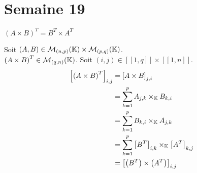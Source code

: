 \documentclass{article}
\renewenvironment{question_kholle}[2][ ]
{
	\subsection{\texorpdfstring{#2}{}}
	\notblank{#1}
	{
		\noindent #1
		\bigbreak
	}
	{}
	\begin{proof}
}
{
	\end{proof}
}
\begin{document}
\pagebreak\section{Semaine 19}

	{$\left(A \times B\right)^T = B^T \times A^T$}

	Soit $(A, B) \in \mathcal{M}_{(n,p)}(\mathbb K) \times \mathcal{M}_{(p,q)}(\mathbb K)$. \\
	$\left(A \times B\right)^T \in \mathcal{M}_{(q,n)}(\mathbb K)$. Soit $(i, j) \in [\![1,q]\!] \!\times\! [\![1,n]\!]$.
	\begin{equation*}
		\begin{aligned}
			\left[ \left(A \times B\right)^T \right]_{i,j}
			 & = \left[A \times B\right]_{j,i}                                          \\
			 & = \sum_{k=1}^{p} A_{j,k} \times_{\mathbb K} B_{k,i}                               \\
			 & = \sum_{k=1}^{p} B_{k,i} \times_{\mathbb K} A_{j,k}                               \\
			 & = \sum_{k=1}^{p} \left[B^T\right]_{i,k} \times_{\mathbb K} \left[A^T\right]_{k,j} \\
			 & = \left[ \left(B^T\right) \times \left(A^T\right) \right]_{i,j}
		\end{aligned}
	\end{equation*}
\end{question_kholle}
\end{document}

